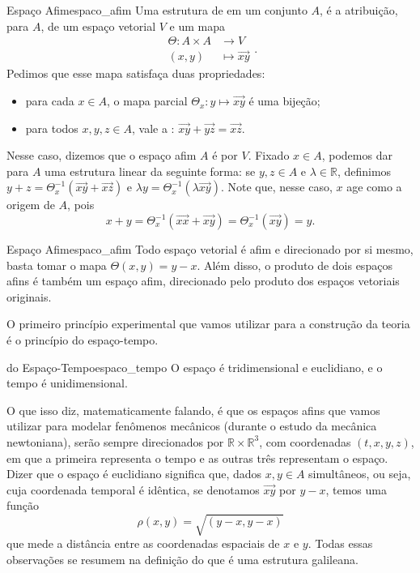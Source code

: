 \documentclass[a4paper,12pt]{book}
\begin{document}
\begin{defi}{Espaço Afim}{espaco_afim}
  Uma estrutura de  em um conjunto $A$, é a atribuição, para $A$, de um espaço vetorial $V$ e um mapa \begin{equation}
    \begin{split}
      \Theta \colon A \times A &\to V \\ (x,y) &\mapsto \overrightarrow{xy}
    \end{split}.
  \end{equation} Pedimos que esse mapa satisfaça duas propriedades:
  \begin{itemize}
    \item para cada $x \in A$, o mapa parcial $\Theta_x \colon y \mapsto \overrightarrow{xy}$ é uma bijeção;
    \item para todos $x,y,z \in A$, vale a : $\overrightarrow{xy} + \overrightarrow{yz} = \overrightarrow{xz}$.
  \end{itemize}

  Nesse caso, dizemos que o espaço afim $A$ é  por $V$. Fixado $x \in A$, podemos dar para $A$ uma estrutura linear da seguinte forma: se $y, z \in A$ e $\lambda \in \mathbb{R}$, definimos $y + z = \Theta_x^{-1}(\overrightarrow{xy} + \overrightarrow{xz})$ e $\lambda y = \Theta_x^{-1}(\lambda \overrightarrow{xy})$. Note que, nesse caso, $x$ age como a origem de $A$, pois $$x + y = \Theta_x^{-1}(\overrightarrow{xx} + \overrightarrow{xy}) = \Theta_x^{-1}(\overrightarrow{xy}) = y.$$
\end{defi}

\begin{exam}{Espaço Afim}{espaco_afim}
  Todo espaço vetorial é afim e direcionado por si mesmo, basta tomar o mapa $\Theta(x,y) = y - x$. Além disso, o produto de dois espaços afins é também um espaço afim, direcionado pelo produto dos espaços vetoriais originais.
\end{exam}

O primeiro princípio experimental que vamos utilizar para a construção da teoria é o princípio do espaço-tempo.

\begin{ax}{do Espaço-Tempo}{espaco_tempo}
  O espaço é tridimensional e euclidiano, e o tempo é unidimensional.
\end{ax}

O que isso diz, matematicamente falando, é que os espaços afins que vamos utilizar para modelar fenômenos mecânicos (durante o estudo da mecânica newtoniana), serão sempre direcionados por $\mathbb{R} \times \mathbb{R}^3$, com coordenadas $(t, x, y, z)$, em que a primeira representa o tempo e as outras três representam o espaço. Dizer que o espaço é euclidiano significa que, dados $x, y \in A$ simultâneos, ou seja, cuja coordenada temporal é idêntica, se denotamos $\overrightarrow{xy}$ por $y - x$, temos uma função $$\rho(x,y) = \sqrt{(y - x, y - x)}$$ que mede a distância entre as coordenadas espaciais de $x$ e $y$. Todas essas observações se resumem na definição do que é uma estrutura galileana.
\end{document}
